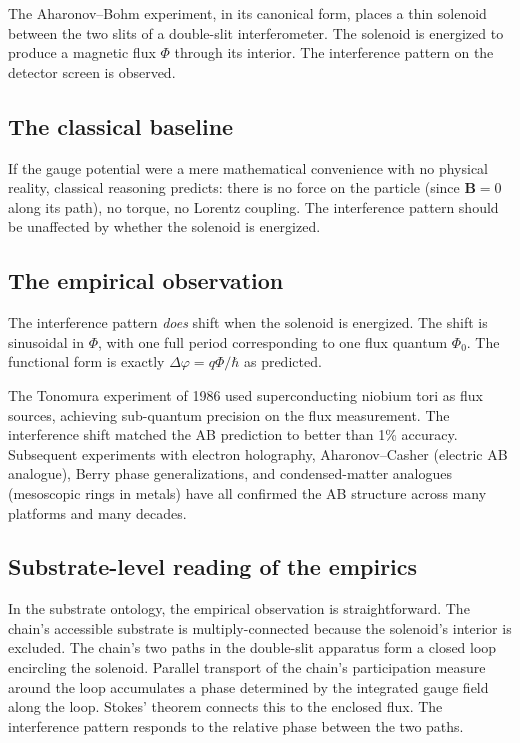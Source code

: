 \documentclass[11pt,a4paper]{article}
\begin{document}
The Aharonov--Bohm experiment, in its canonical form, places a thin solenoid between the two slits of a double-slit interferometer. The solenoid is energized to produce a magnetic flux $\Phi$ through its interior. The interference pattern on the detector screen is observed.

\subsection{The classical baseline}

If the gauge potential were a mere mathematical convenience with no physical reality, classical reasoning predicts: there is no force on the particle (since $\mathbf{B} = 0$ along its path), no torque, no Lorentz coupling. The interference pattern should be unaffected by whether the solenoid is energized.

\subsection{The empirical observation}

The interference pattern \emph{does} shift when the solenoid is energized. The shift is sinusoidal in $\Phi$, with one full period corresponding to one flux quantum $\Phi_0$. The functional form is exactly $\Delta\varphi = q\Phi/\hbar$ as predicted.

The Tonomura experiment of 1986 used superconducting niobium tori as flux sources, achieving sub-quantum precision on the flux measurement. The interference shift matched the AB prediction to better than 1\% accuracy. Subsequent experiments with electron holography, Aharonov--Casher (electric AB analogue), Berry phase generalizations, and condensed-matter analogues (mesoscopic rings in metals) have all confirmed the AB structure across many platforms and many decades.

\subsection{Substrate-level reading of the empirics}

In the substrate ontology, the empirical observation is straightforward. The chain's accessible substrate is multiply-connected because the solenoid's interior is excluded. The chain's two paths in the double-slit apparatus form a closed loop encircling the solenoid. Parallel transport of the chain's participation measure around the loop accumulates a phase determined by the integrated gauge field along the loop. Stokes' theorem connects this to the enclosed flux. The interference pattern responds to the relative phase between the two paths.
\end{document}
